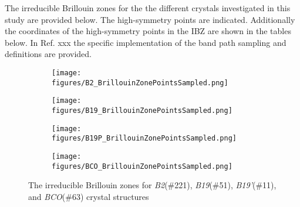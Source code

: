 \documentclass[preprint,colorlinks=true,linkcolor=black,citecolor=black]{elsarticle}
\begin{document}
The irreducible Brillouin zones for the the different crystals investigated in this study are provided below. The high-symmetry points are indicated. Additionally the coordinates of the high-symmetry points in the IBZ are shown in the tables below. In Ref. xxx the  specific implementation of the band path sampling and definitions are provided.


\begin{figure}[!htp]
  \centering
  \begin{subfigure}[b]{0.45\linewidth}
      \texttt{[image: figures/B2\_BrillouinZonePointsSampled.png]}
      \caption{}
      \label{fig:B2}
  \end{subfigure}
  \hfill
  \begin{subfigure}[b]{0.45\linewidth}
      \texttt{[image: figures/B19\_BrillouinZonePointsSampled.png]}
      \caption{}
      \label{fig:B19}
  \end{subfigure}
  \vspace{1mm}
  \begin{subfigure}[b]{0.45\linewidth}
      \texttt{[image: figures/B19P\_BrillouinZonePointsSampled.png]}
      \caption{}
      \label{fig:B19P}
  \end{subfigure}
  \hfill
  \begin{subfigure}[b]{0.45\linewidth}
      \texttt{[image: figures/BCO\_BrillouinZonePointsSampled.png]}
      \caption{}
      \label{fig:BCO}
  \end{subfigure}
  \caption{The irreducible Brillouin zones for \textit{B2}(\#221), \textit{B19}(\#51), \textit{B19'}(\#11), and \textit{BCO}(\#63) crystal structures}
  \label{fig:ibz}
\end{figure}

\pagebreak

\end{document}
